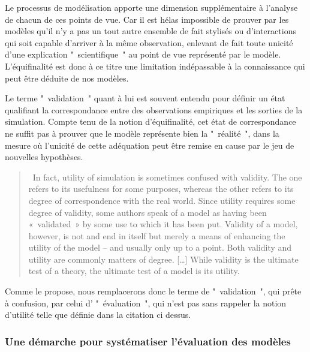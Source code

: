 Le processus de modélisation apporte une dimension supplémentaire à l'analyse de chacun de ces points de vue. Car  il est hélas  impossible de prouver par les modèles qu'il n'y a pas un tout autre ensemble de fait stylisés ou d'interactions qui soit capable d'arriver à la même observation, enlevant de fait toute unicité d’une explication " scientifique " au point de vue représenté par le modèle. L'équifinalité est donc à ce titre une limitation indépassable à la connaissance qui peut être déduite de nos modèles.

Le terme " validation " quant à lui est souvent entendu pour définir un état qualifiant la correspondance entre des observations empiriques et les sorties de la simulation. Compte tenu de la notion d'équifinalité, cet état de correspondance ne suffit pas à prouver que le modèle représente bien la " réalité ", dans la mesure où l’unicité de  cette adéquation peut être remise en cause par le jeu de nouvelles hypothèses.

\begin{quotation} In fact, utility of simulation is sometimes confused with validity. The one refers to its usefulness for some purposes, whereas the other refers to its degree of correspondence with the real world. Since utility requires some degree of validity, some authors speak of a model as having been « validated » by some use to which it has been put. Validity of a model, however, is not and end in itself but merely a means of enhancing the utility of the model – and usually only up to a point. Both validity and utility are commonly matters of degree. […] While validity is the ultimate test of a theory, the ultimate test of a model is its utility.  \\ \end{quotation}

Comme  le propose, nous remplacerons donc le terme de " validation ", qui prête à confusion,  par celui d’ " évaluation ", qui n'est pas sans rappeler la notion d'utilité telle que définie dans la citation ci dessus.

\subsubsection{Une démarche pour systématiser l'évaluation des modèles}

